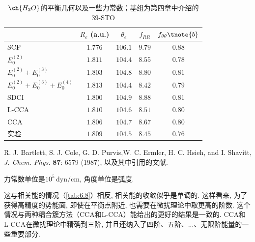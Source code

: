 \begin{table}
	\centering
	\caption{$\ch{H_2O}$的平衡几何以及一些力常数；基组为第四章中介绍的39-STO}
	\begin{threeparttable}
		\begin{tabular}{lcccc}
                    \hline & $R_e$ (a.u.) & $\theta_e$ & $f_{R R}$\tnote{b} & $f_{\theta \theta}\tnote{b}$ \\
			\hline SCF & $1.776$ & $106.1$ & $9.79$ & $0.88$ \\
			$E_0^{(2)}$ & $1.811$ & $104.4$ & $8.55$ & $0.78$ \\
			$E_0^{(2)}+E_0^{(3)}$ & $1.803$ & $104.8$ & $8.80$ & $0.81$ \\
			$E_0^{(2)}+E_0^{(3)}+E_0^{(4)}$ & $1.813$ & $104.4$ & $8.42$ & $0.79$ \\
			SDCI & $1.800$ & $104.9$ & $8.88$ & $0.81$ \\
			L-CCA & $1.810$ & $104.6$ & $8.51$ & $0.80$ \\
			CCA & $1.806$ & $104.7$ & $8.67$ & $0.80$ \\
			实验 & $1.809$ & $104.5$ & $8.45$ & $0.76$ \\
			\hline
		\end{tabular}
		\begin{tablenotes}
			\item[a] R. J. Bartlett, S. J. Cole, G. D. Purvis,W. C. Ermler, H. C. Hsieh, and I. Shavitt, \textit{J. Chem. Phys.} \textbf{87}: 6579 (1987), 以及其中引用的文献. 
			\item[b] 力常数单位是$10^5\,\mathrm{dyn/cm}$, 角度单位是弧度. 
		\end{tablenotes}
	\end{threeparttable}
\label{tab:6.9}
\end{table}

这与相关能的情况（\autoref{tab:6.8}）相反, 相关能的收敛似乎是单调的. 
这样看来, 为了获得高精度的势能面, 即使在平衡点附近, 也需要在微扰理论中取更高的阶数. 
这个情况与两种耦合簇方法（CCA和L-CCA）能给出的更好的结果是一致的. 
CCA和L-CCA在微扰理论中精确到三阶, 并且还纳入了四阶、五阶、...、无限阶能量的一些重要部分. 

